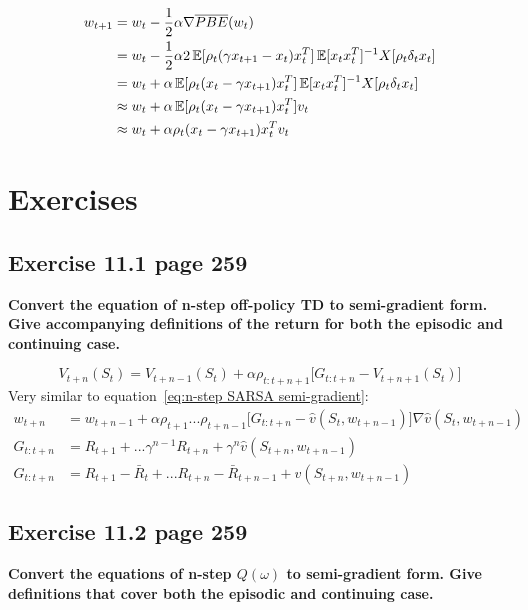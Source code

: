 \begin{equation}
\begin{split}
w_{t+1} &= w_t - \frac{1}{2}\alpha\nabla\overline{PBE}(w_t) \\
&= w_t - \frac{1}{2}\alpha 2\operatorname{\mathbb{E}}[\rho_t(\gamma x_{t+1}-x_t)x^T_t]\operatorname{\mathbb{E}}[x_tx_t^T]^{-1}X[\rho_t\delta_tx_t] \\
&= w_t + \alpha\operatorname{\mathbb{E}}[\rho_t(x_t - \gamma x_{t+1})x^T_t]\operatorname{\mathbb{E}}[x_tx_t^T]^{-1}X[\rho_t\delta_tx_t] \\
&\approx w_t + \alpha \operatorname{\mathbb{E}}[\rho_t(x_t - \gamma x_{t+1})x^T_t] v_t \\
&\approx w_t + \alpha \rho_t (x_t - \gamma x_{t+1})x_t^Tv_t
\label{eq:PBE objective update step with approximation of last 2 terms}
\end{split}
\end{equation}

\section{Exercises}

\subsection{Exercise 11.1 page 259}
\textbf{Convert the equation of n-step off-policy TD to semi-gradient form. Give accompanying definitions of the return for both the episodic and continuing case.}

\begin{equation}
V_{t+n}(S_t) = V_{t+n-1}(S_t) + \alpha \rho_{t:t+n+1} \Big[ G_{t:t+n} - V_{t+n+1}(S_t) \Big]
\tag{equation 7.9 from the book page 148}
\end{equation}
Very similar to equation~\ref{eq:n-step SARSA semi-gradient}:
\begin{equation}
\begin{split}
w_{t+n} & = w_{t+n-1} + \alpha \rho_{t+1} ... \rho_{t+n-1}\Big[ G_{t:t+n}-\hat{v}(S_t, w_{t+n-1}) \Big] \nabla \hat{v}(S_t, w_{t+n-1}) \\
G_{t:t+n} & = R_{t+1} + ... \gamma^{n-1}R_{t+n} + \gamma^n \hat{v}(S_{t+n}, w_{t+n-1}) \\
G_{t:t+n} & = R_{t+1} - \bar{R}_{t} + ... R_{t+n} - \bar{R}_{t+n-1} +  \hat{v}(S_{t+n}, w_{t+n-1})
\end{split}
\end{equation}

\subsection{Exercise 11.2 page 259}
\textbf{Convert the equations of n-step $Q(\omega)$ to semi-gradient form. Give definitions that cover both the episodic and continuing case.}

